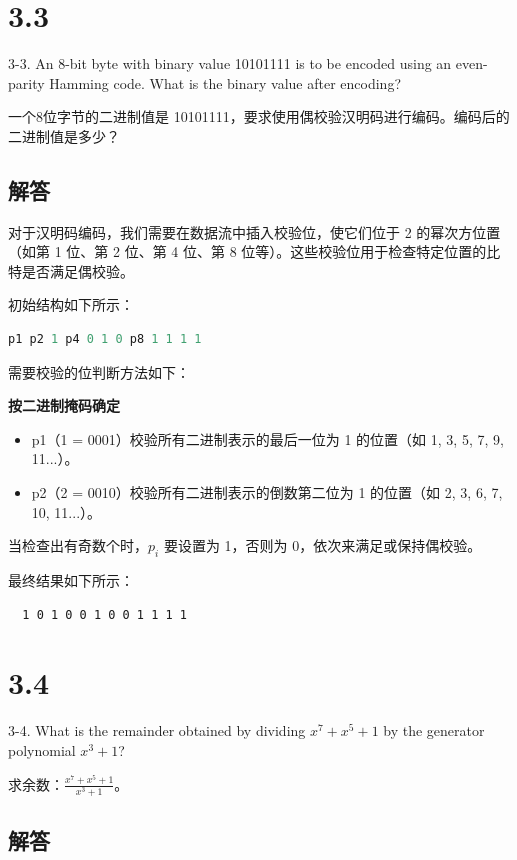 \section{3.3}

3-3. An 8-bit byte with binary value 10101111 is to be encoded using an even-parity Hamming code. What is the binary value after encoding?

一个8位字节的二进制值是 10101111，要求使用偶校验汉明码进行编码。编码后的二进制值是多少？

\subsection*{解答}

对于汉明码编码，我们需要在数据流中插入校验位，使它们位于 2 的幂次方位置（如第 1 位、第 2 位、第 4 位、第 8 位等）。这些校验位用于检查特定位置的比特是否满足偶校验。

初始结构如下所示：

\begin{lstlisting}[language=C]
  p1 p2 1 p4 0 1 0 p8 1 1 1 1
\end{lstlisting}

需要校验的位判断方法如下：

\textbf{按二进制掩码确定}

\begin{itemize}
  \item p1（1 = 0001）校验所有二进制表示的最后一位为 1 的位置（如 1, 3, 5, 7, 9, 11...）。
  \item p2（2 = 0010）校验所有二进制表示的倒数第二位为 1 的位置（如 2, 3, 6, 7, 10, 11...）。
\end{itemize}

当检查出有奇数个时，$p_{i}$ 要设置为 1，否则为 0，依次来满足或保持偶校验。

最终结果如下所示：
\begin{lstlisting}
  1 0 1 0 0 1 0 0 1 1 1 1
\end{lstlisting}

\section{3.4}

3-4. What is the remainder obtained by dividing $x^7 + x^5 + 1$ by the generator polynomial $x^3 + 1$?

求余数：$\frac{x^7 + x^5 + 1}{x^3 + 1}$。

\subsection*{解答}


